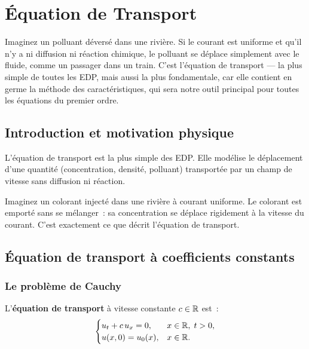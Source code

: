 \chapter{\'Equation de Transport}
\label{ch:transport}

Imaginez un polluant d\'evers\'e dans une rivi\`ere. Si le courant est
uniforme et qu'il n'y a ni diffusion ni r\'eaction chimique, le polluant se
d\'eplace simplement avec le fluide, comme un passager dans un train. C'est
l'\'equation de transport --- la plus simple de toutes les EDP, mais aussi
la plus fondamentale, car elle contient en germe la m\'ethode des
caract\'eristiques, qui sera notre outil principal pour toutes les \'equations
du premier ordre.

\section{Introduction et motivation physique}

L'\'equation de transport est la plus simple des EDP. Elle mod\'elise le
d\'eplacement d'une quantit\'e (concentration, densit\'e, polluant) transport\'ee
par un champ de vitesse sans diffusion ni r\'eaction.

\begin{intuition}
Imaginez un colorant inject\'e dans une rivi\`ere \`a courant uniforme.
Le colorant est emport\'e sans se m\'elanger~: sa concentration se d\'eplace
rigidement \`a la vitesse du courant. C'est exactement ce que d\'ecrit
l'\'equation de transport.
\end{intuition}

\section{\'Equation de transport \`a coefficients constants}

\subsection{Le probl\`eme de Cauchy}

\begin{definition}
L'\textbf{\'equation de transport} \`a vitesse constante $c \in \mathbb{R}$ est~:
\begin{equation}\label{eq:transport_homogene}
    \begin{cases}
        u_t + c\, u_x = 0, & x \in \mathbb{R},\; t > 0,\\
        u(x,0) = u_0(x), & x \in \mathbb{R}.
    \end{cases}
\end{equation}
\end{definition}

